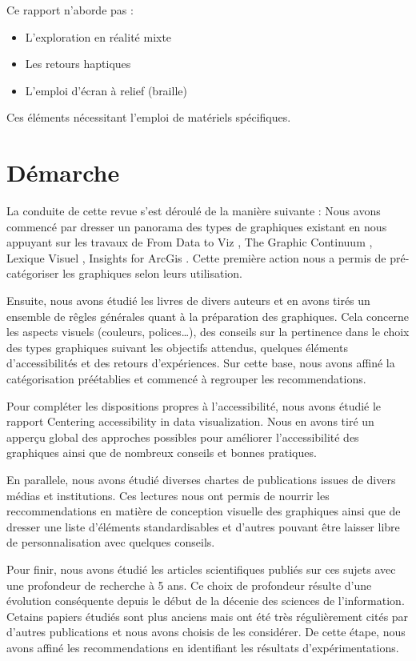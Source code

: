 \documentclass[a4paper,12pt]{article}
\begin{document}
\begin{multicols}{2}
Ce rapport n'aborde pas :
\begin{itemize}
\item L'exploration en réalité mixte
\item Les retours haptiques
\item L'emploi d'écran à relief (braille)
\end{itemize}
Ces éléments nécessitant l'emploi de matériels spécifiques.
\section*{Démarche}
\label{sec:org0eb571e}
La conduite de cette revue s'est déroulé de la manière suivante :
Nous avons commencé par dresser un panorama des types de graphiques existant en nous appuyant sur les travaux de \og From Data to Viz\fg{} \autocite{yanholtzDataViz2018}, \og The Graphic Continuum\fg{} \autocite{jonathanschwabishGraphicContinuum2014}, \og Lexique Visuel\fg{} \autocite{alansmithLexiqueVisuel}, \og Insights for ArcGis\fg{} \autocite{lindabealeInsightsArcGIS2017}.
Cette première action nous a permis de pré-catégoriser les graphiques selon leurs utilisation.

Ensuite, nous avons étudié les livres de divers auteurs et en avons tirés un ensemble de rêgles générales quant à la préparation des graphiques. Cela concerne les aspects visuels (couleurs, polices\ldots{}), des conseils sur la pertinence dans le choix des types graphiques suivant les objectifs attendus, quelques éléments d'accessibilités et des retours d'expériences. Sur cette base, nous avons affiné la catégorisation préétablies et commencé à regrouper les recommendations.

Pour compléter les dispositions propres à l'accessibilité, nous avons étudié le rapport \og Centering accessibility in data visualization\fg{}. \autocite{schwabishCenteringAccessibilityData2022} Nous en avons tiré un apperçu global des approches possibles pour améliorer l'accessibilité des graphiques ainsi que de nombreux conseils et bonnes pratiques.

En parallele, nous avons étudié diverses chartes de publications issues de divers médias et institutions. Ces lectures nous ont permis de nourrir les reccommendations en matière de conception visuelle des graphiques ainsi que de dresser une liste d'éléments standardisables et d'autres pouvant être laisser libre de personnalisation avec quelques conseils.

Pour finir, nous avons étudié les articles scientifiques publiés sur ces sujets avec une profondeur de recherche à 5 ans. Ce choix de profondeur résulte d'une évolution conséquente depuis le début de la décenie des sciences de l'information. Cetains papiers étudiés sont plus anciens mais ont été très régulièrement cités par d'autres publications et nous avons choisis de les considérer. De cette étape, nous avons affiné les recommendations en identifiant les résultats d'expérimentations.

\end{multicols}
\end{document}
